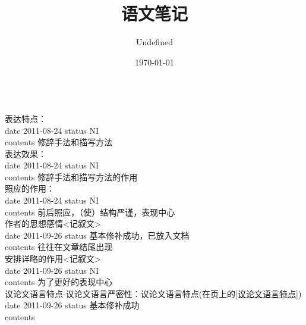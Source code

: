 \documentclass{article}
\makeatletter
\newcommand\hatabstractname{Abstract}
\newenvironment{hatabstract}{%
      \titlepage
      \null\vfil
      \@beginparpenalty\@lowpenalty
      \begin{center}%
        \bfseries \abstractname
        \@endparpenalty\@M
      \end{center}}%
     {\par\vfil\null\endtitlepage}
\newenvironment{hatabstract}{%
      \if@twocolumn
        \section*{\hatabstractname}%
      \else
        \small
        \begin{center}%
          {\bfseries \hatabstractname\vspace{-.5em}\vspace{\z@}}%
        \end{center}%
        \quotation
      \fi}
      {\if@twocolumn\else\endquotation\fi}
\newcommand{\superref}[1]{#1(在\pageref{#1}页上的\ref{#1})}
\newcommand{\hati}[4]{\\#1\\\colorbox{gray!25}{date #2 status #4}\\\colorbox{gray!50}{contents #3}}
\makeatother
\begin{document}
{{\begin{lrbox}{\contentofabstract}                  %
\begin{minipage}{\linewidth}                       %
\CN                                                %
\end{minipage}                                     %
\end{lrbox}                                        %
}{%
}}                          %

\newsavebox{\issue}
\begin{lrbox}{\issue}
\begin{minipage}{\linewidth}
\hati{表达特点：}{2011-08-24}{修辞手法和描写方法}{NI}
\hati{表达效果：}{2011-08-24}{修辞手法和描写方法的作用}{NI}
\hati{照应的作用：}{2011-08-24}{前后照应，（使）结构严谨，表现中心}{NI}
\hati{作者的思想感情<记叙文>}{2011-09-26}{往往在文章结尾出现}{基本修补成功，已放入文档}
\hati{安排详略的作用<记叙文>}{2011-09-26}{为了更好的表现中心}{NI}
\hati{议论文语言特点-议论文语言严密性：\superref{议论文语言特点}}{2011-09-26}{}{基本修补成功}
\end{minipage}
\end{lrbox}

\title{语文笔记}                                   %
\author{Undefined}                                 %
\date{\today}                                      %
{}                               %
\maketitle                                         %
\begin{hatabstract}                                %
\usebox{\contentofabstract}                        %
\end{hatabstract}\label{abstractformal}            %
\end{document}
